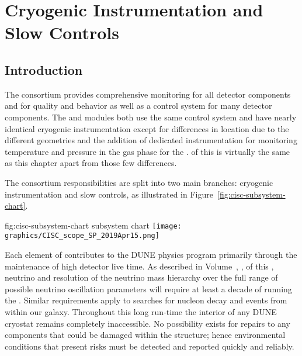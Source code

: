 \chapter{Cryogenic Instrumentation and Slow Controls}
\label{ch:sp-cisc}


\section{Introduction} 

The  consortium provides comprehensive monitoring for all detector  components and for  quality and behavior as well as a control system for many detector components.
The  and  modules both use the same control
system and have nearly identical cryogenic instrumentation except
for differences in location due to the different 
geometries and the addition of dedicated instrumentation for
monitoring temperature and pressure in the gas phase for the
.  \dpchcisc %
of this
 is virtually the same as this chapter apart from
those few differences.


The consortium responsibilities are split into 
two main branches: cryogenic instrumentation and slow controls, as illustrated in  Figure~\ref{fig:cisc-subsystem-chart}. %

\begin{dunefigure}{fig:cisc-subsystem-chart}
  { subsystem chart}
  \texttt{[image: graphics/CISC\_scope\_SP\_2019Apr15.png]}
\end{dunefigure}

Each element of  contributes to the DUNE physics program primarily through the maintenance of high detector live time.  As described in Volume~\volnumberphysics{}, \voltitlephysics{}, of this , neutrino  and resolution of the neutrino mass hierarchy over the full range of possible neutrino oscillation parameters will require at least a decade of running the .  Similar requirements apply to searches for nucleon decay and  events from within our galaxy.  Throughout this long run-time the interior of any DUNE cryostat remains completely inaccessible.  No possibility exists for repairs to any components that could be damaged within the  structure; hence environmental conditions that present risks must be detected and reported quickly and reliably. 
 
